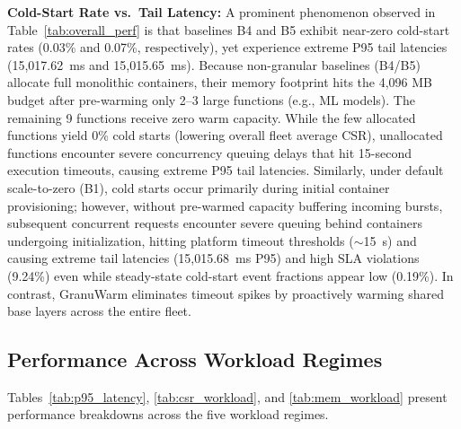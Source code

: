 \documentclass[final,5p,times,twocolumn]{elsarticle}
\begin{document}
\textbf{Cold-Start Rate vs.\ Tail Latency:} A prominent phenomenon observed in Table~\ref{tab:overall_perf} is that baselines B4 and B5 exhibit near-zero cold-start rates (0.03\% and 0.07\%, respectively), yet experience extreme P95 tail latencies (15,017.62~ms and 15,015.65~ms). Because non-granular baselines (B4/B5) allocate full monolithic containers, their memory footprint hits the 4,096 MB budget after pre-warming only 2--3 large functions (e.g., ML models). The remaining 9 functions receive zero warm capacity. While the few allocated functions yield 0\% cold starts (lowering overall fleet average CSR), unallocated functions encounter severe concurrency queuing delays that hit 15-second execution timeouts, causing extreme P95 tail latencies. Similarly, under default scale-to-zero (B1), cold starts occur primarily during initial container provisioning; however, without pre-warmed capacity buffering incoming bursts, subsequent concurrent requests encounter severe queuing behind containers undergoing initialization, hitting platform timeout thresholds ($\sim$15~s) and causing extreme tail latencies (15,015.68~ms P95) and high SLA violations (9.24\%) even while steady-state cold-start event fractions appear low (0.19\%). In contrast, GranuWarm eliminates timeout spikes by proactively warming shared base layers across the entire fleet.

\subsection{Performance Across Workload Regimes}

Tables~\ref{tab:p95_latency}, \ref{tab:csr_workload}, and \ref{tab:mem_workload} present performance breakdowns across the five workload regimes.

\begin{table}[htbp]
\centering
\caption{P95 Tail Latency (ms) by Workload Regime}
\label{tab:p95_latency}
\end{table}
\end{document}
